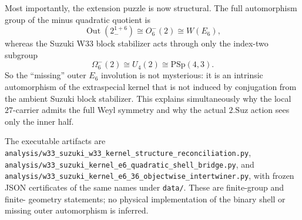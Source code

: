 Most importantly, the extension puzzle is now structural.  The full automorphism group of
the minus quadratic quotient is
\[
 \operatorname{Out}(2_-^{1+6})\cong O_6^-(2)\cong W(E_6),
\]
whereas the Suzuki W33 block stabilizer acts through only the index-two subgroup
\[
 \Omega_6^-(2)\cong U_4(2)\cong\mathrm{PSp}(4,3).
\]
So the ``missing'' outer $E_6$ involution is not mysterious: it is an intrinsic automorphism
of the extraspecial kernel that is not induced by conjugation from the ambient Suzuki block
stabilizer.  This explains simultaneously why the local $27$-carrier admits the full Weyl
symmetry and why the actual $2.\mathrm{Suz}$ action sees only the inner half.

The executable artifacts are
\texttt{analysis/w33\_suzuki\_w33\_kernel\_structure\_reconciliation.py},
\texttt{analysis/w33\_suzuki\_kernel\_e6\_quadratic\_shell\_bridge.py}, and
\texttt{analysis/w33\_suzuki\_kernel\_e6\_36\_objectwise\_intertwiner.py}, with frozen JSON
certificates of the same names under \texttt{data/}.  These are finite-group and finite-
geometry statements; no physical implementation of the binary shell or missing outer
automorphism is inferred.
